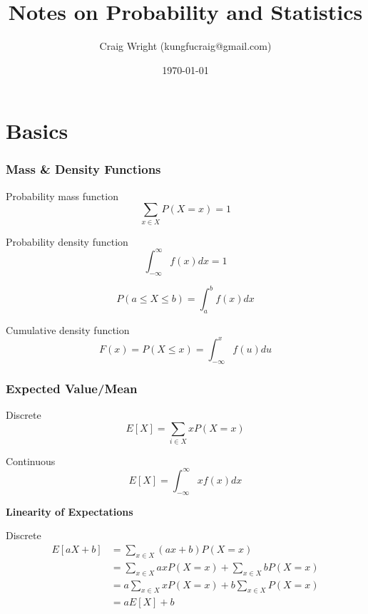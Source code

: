 \documentclass{article}
\begin{document}
\title{Notes on Probability and Statistics}
\author{Craig Wright (kungfucraig@gmail.com)}
\date{\today}
\maketitle
\newpage

\tableofcontents
\newpage

\part{Basics}
\section{Mass \& Density Functions}

Probability mass function
\begin{equation*}
\sum_{x \in X} P(X=x) = 1 
\end{equation*}

Probability density function
\begin{equation*}
\int_{-\infty}^{\infty}  f(x)dx = 1 
\end{equation*}

\begin{equation*}
P(a \leq X \leq b) = \int_{a}^{b}  f(x)dx 
\end{equation*}

Cumulative density function
\begin{equation*}
F(x) = P(X \leq x) = \int_{-\infty}^{x}  f(u)du
\end{equation*}


\section{Expected Value/Mean}

Discrete
\begin{equation*}
  E[X]=\sum_{i\in X}xP(X=x)
\end{equation*}

Continuous
\begin{equation*}
  E[X]=\int_{-\infty}^{\infty} x f(x) dx
\end{equation*}

\textbf{Linearity of Expectations}

Discrete
\begin{align*}
  E[aX+b] &= \sum_{x\in X} (ax+b) P(X=x) \\
  &= \sum_{x\in X} ax P(X=x) +  \sum_{x \in X} b P(X=x) \\
  &= a \sum_{x\in X} x P(X=x) +  b \sum_{x \in X} P(X=x) \\
  &= a E[X] + b \\
\end{align*}
\end{document}
